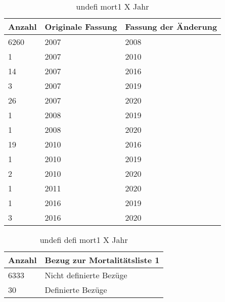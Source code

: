 \begin{table}[ht]
	\centering
	\caption[Undefinierte Bezüge zur Mortalitätsliste 1]{undefi mort1 X Jahr}
	\label{tab:mort1}
	\begin{tabular}{|l|l|l|}
		\hline
		\rowcolor{lightgray} Anzahl & Originale Fassung & Fassung der Änderung \\ \hline
		6260 & 2007 & 2008 \\ \hline
		1 & 2007 & 2010 \\ \hline
		14 & 2007 & 2016 \\ \hline
		3 & 2007 & 2019 \\ \hline
		26 & 2007 & 2020 \\ \hline
		1 & 2008 & 2019 \\ \hline
		1 & 2008 & 2020 \\ \hline
		19 & 2010 & 2016 \\ \hline
		1 & 2010 & 2019 \\ \hline
		2 & 2010 & 2020 \\ \hline
		1 & 2011 & 2020 \\ \hline
		1 & 2016 & 2019 \\ \hline
		3 & 2016 & 2020 \\ \hline	
	\end{tabular}
\end{table}

\newpage

\begin{table}[ht]
	\centering
	\caption[Undefinierte und definierte Bezüge zur Mortalitätsliste 1]{undefi defi mort1 X Jahr}
	\label{tab:mort1defundef}
	\begin{tabular}{|l|l|}
		\hline
		\rowcolor{lightgray} Anzahl & Bezug zur Mortalitätsliste 1 \\ \hline
		6333 & Nicht definierte Bezüge \\ \hline
		30 & Definierte Bezüge \\ \hline		
	\end{tabular}
\end{table}

\newpage






